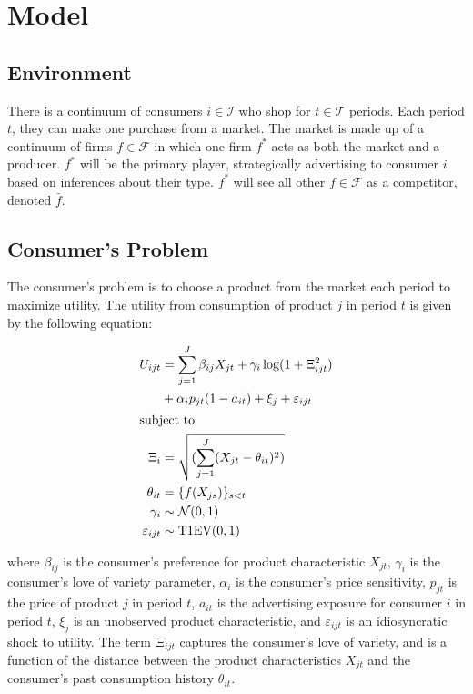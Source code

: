 \documentclass[12pt]{article}
\begin{document}
\section{Model}

    \subsection{Environment}
    There is a continuum of consumers $i\in\mathcal{I}$ who shop for $t\in\mathcal{T}$ periods. Each period $t$, they can make one purchase from a market. The market is made up of a continuum of firms $f\in\mathcal{F}$ in which one firm $f^*$ acts as both the market and a producer. $f^*$ will be the primary player, strategically advertising to consumer $i$ based on inferences about their type. $f^*$ will see all other $f\in\mathcal{F}$ as a competitor, denoted $\bar{f}$.


    \subsection{Consumer's Problem}
    The consumer's problem is to choose a product from the market each period to maximize utility. The utility from consumption of product $j$ in period $t$ is given by the following equation:

    \begin{alignat*}{1}
      U_{ijt} &= \sum_{j=1}^J\beta_{ij} X_{jt} + \gamma_i \log(1 + \Xi_{ijt}^2) \\
           &+ \alpha_i p_{jt}(1 - a_{it}) + \xi_j + \varepsilon_{ijt} \\
    \shortintertext{subject to}
       \Xi_i &= \sqrt{(\sum_{j=1}^J(X_{jt}-\theta_{it})^2)} \\
       \theta_{it} &= \{f(X_{js})\}_{s<t} \\
       \gamma_i &\sim \mathcal{N}(0, 1)\\ \varepsilon_{ijt} &\sim \text{T1EV}(0,1)
    \end{alignat*}

    where $\beta_{ij}$ is the consumer's preference for product characteristic $X_{jt}$, $\gamma_i$ is the consumer's love of variety parameter, $\alpha_i$ is the consumer's price sensitivity, $p_{jt}$ is the price of product $j$ in period $t$, $a_{it}$ is the advertising exposure for consumer $i$ in period $t$, $\xi_j$ is an unobserved product characteristic, and $\varepsilon_{ijt}$ is an idiosyncratic shock to utility. The term $\Xi_{ijt}$ captures the consumer's love of variety, and is a function of the distance between the product characteristics $X_{jt}$ and the consumer's past consumption history $\theta_{it}$. 
\end{document}
